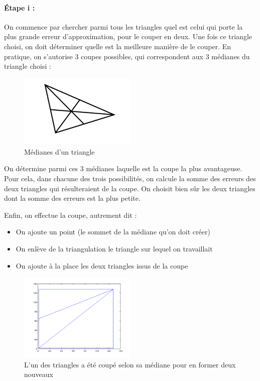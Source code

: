 \documentclass{report}
\begin{document}
\clearpage

\paragraph{Étape i :}

On commence par chercher parmi tous les triangles quel est celui qui porte la plus grande erreur d'approximation, pour le couper en deux. Une fois ce triangle choisi, on doit déterminer quelle est la meilleure manière de le couper. En pratique, on s'autorise 3 coupes possibles, qui correspondent aux 3 médianes du triangle choisi :

\begin{figure}[ht]
\centering
\includegraphics[width=0.5\textwidth]{triangle.png}
\caption{Médianes d'un triangle}
\end{figure}

On détermine parmi ces 3 médianes laquelle est la coupe la plus avantageuse. Pour cela, dans chacune des trois possibilités, on calcule la somme des erreurs des deux triangles qui résulteraient de la coupe. On choisit bien sûr les deux triangles dont la somme des erreurs est la plus petite.

Enfin, on effectue la coupe, autrement dit :
\begin{itemize}
	\item On ajoute un point (le sommet de la médiane qu'on doit créer)
	\item On enlève de la triangulation le triangle sur lequel on travaillait
	\item On ajoute à la place les deux triangles issus de la coupe
\end{itemize}


\begin{figure}[ht]
\centering
\includegraphics[width=0.5\textwidth]{beginBissect2.png}
\caption{L'un des triangles a été coupé selon sa médiane pour en former deux nouveaux}
\end{figure}
\end{document}
